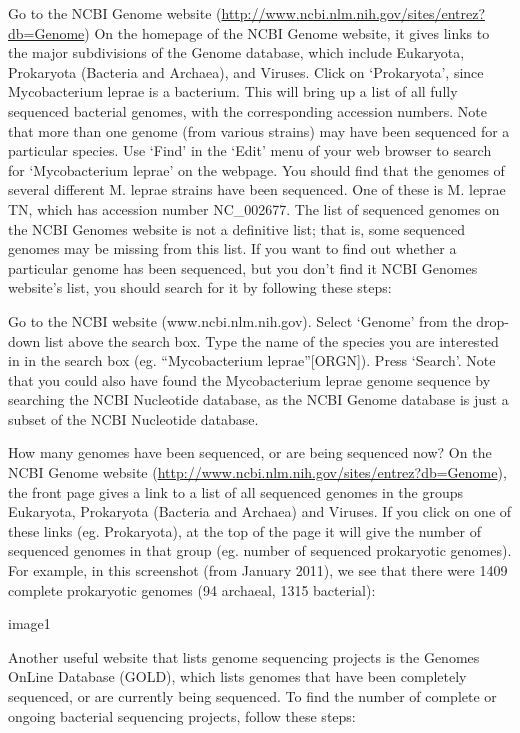 \documentclass[
]{book}
\begin{document}
Go to the NCBI Genome website (\url{http://www.ncbi.nlm.nih.gov/sites/entrez?db=Genome})
On the homepage of the NCBI Genome website, it gives links to the major subdivisions of the Genome database, which include Eukaryota, Prokaryota (Bacteria and Archaea), and Viruses. Click on `Prokaryota', since Mycobacterium leprae is a bacterium. This will bring up a list of all fully sequenced bacterial genomes, with the corresponding accession numbers. Note that more than one genome (from various strains) may have been sequenced for a particular species.
Use `Find' in the `Edit' menu of your web browser to search for `Mycobacterium leprae' on the webpage. You should find that the genomes of several different M. leprae strains have been sequenced. One of these is M. leprae TN, which has accession number NC\_002677.
The list of sequenced genomes on the NCBI Genomes website is not a definitive list; that is, some sequenced genomes may be missing from this list. If you want to find out whether a particular genome has been sequenced, but you don't find it NCBI Genomes website's list, you should search for it by following these steps:

Go to the NCBI website (www.ncbi.nlm.nih.gov).
Select `Genome' from the drop-down list above the search box.
Type the name of the species you are interested in in the search box (eg. ``Mycobacterium leprae''{[}ORGN{]}). Press `Search'.
Note that you could also have found the Mycobacterium leprae genome sequence by searching the NCBI Nucleotide database, as the NCBI Genome database is just a subset of the NCBI Nucleotide database.

How many genomes have been sequenced, or are being sequenced now?
On the NCBI Genome website (\url{http://www.ncbi.nlm.nih.gov/sites/entrez?db=Genome}), the front page gives a link to a list of all sequenced genomes in the groups Eukaryota, Prokaryota (Bacteria and Archaea) and Viruses. If you click on one of these links (eg. Prokaryota), at the top of the page it will give the number of sequenced genomes in that group (eg. number of sequenced prokaryotic genomes). For example, in this screenshot (from January 2011), we see that there were 1409 complete prokaryotic genomes (94 archaeal, 1315 bacterial):

image1

Another useful website that lists genome sequencing projects is the Genomes OnLine Database (GOLD), which lists genomes that have been completely sequenced, or are currently being sequenced. To find the number of complete or ongoing bacterial sequencing projects, follow these steps:
\end{document}

